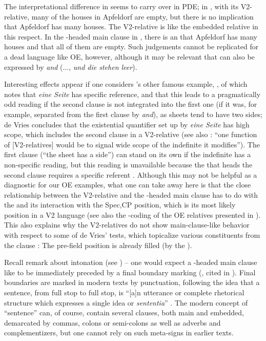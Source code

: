 \documentclass[output=paper,colorlinks,citecolor=brown]{langscibook}
\begin{document}
The interpretational difference in  seems to carry over in PDE; in , with its V2-relative, many of the houses in Apfeldorf are empty, but there is no implication that Apfeldorf has many houses. The V2-relative is like the embedded relative in this respect. In the -headed main clause in , there is an  that Apfeldorf has many houses and that all of them are empty. Such judgements cannot be replicated for a dead language like OE, however, although it may be relevant that  can also be expressed by \textit{and} (..., \textit{und die stehen leer}). 

Interesting effects appear if one considers \citet{Gärtner2001}'s other famous example, , of which \citet[195]{deVries2012} notes that \textit{eine Seite} has specific reference, and that this leads to a pragmatically odd reading if the second clause is not integrated into the first one (if it was, for example, separated from the first clause by \textit{and}), as sheets tend to have two sides; de Vries concludes that the existential quantifier set up by \textit{eine Seite} has high scope, which includes the second clause in a V2-relative (see also \citealt[129]{Gärtner2001}: “one function of [V2-relatives] would be to signal wide scope of the indefinite it modifies”). The first clause (“the sheet has a side”) can stand on its own if the indefinite has a non-specific reading, but this reading is unavailable because the  that heads the second clause requires a specific referent \citep[195]{deVries2012}. Although this may not be helpful as a diagnostic for our OE examples, what one can take away here is that the close relationship between the V2-relative and the -headed main clause has to do with the  and its interaction with the Spec,CP position, which is its most likely position in a V2 language (see also the -coding of the OE relatives presented in ). This also explains why the V2-relatives do not show main-clause-like behavior with respect to some of de Vries' tests, which topicalize various constituents from the clause \citep[182--183]{deVries2012}: The pre-field position is already filled (by the ).

Recall  remark about intonation (see ) – one would expect a -headed main clause like  to be immediately preceded by a final boundary marking (\citealt{Ladd1986}, cited in \citealt[98]{Gärtner2001}). Final boundaries are marked in modern texts by punctuation, following the idea that a sentence, from full stop to full stop, is “[a]n utterance or complete rhetorical structure which expresses a single idea or \textit{sententia}” \citep[306]{Parkes1992}. The modern concept of “sentence” can, of course, contain several clauses, both main and embedded, demarcated by commas, colons or semi-colons as well as adverbs and complementizers, but one cannot rely on such meta-signs in earlier texts. 
\end{document}
